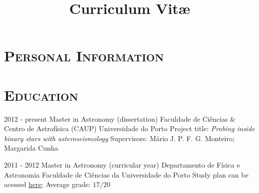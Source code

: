 \documentclass[10pt]{moderncv}
\title{Curriculum Vit\ae{}}
\begin{document}
\maketitle

\section{\textsc{Personal Information}}





\section{\textsc{Education}}

\cventry
	{2012 - present}
	{Master in Astronomy (dissertation)}
	{\newline Faculdade de Ciências \& Centro de Astrofísica (CAUP)}
	{Universidade do Porto}
	{\newline Project title: \emph{Probing inside binary stars with asteroseismology}
	\newline
	Supervisors: Mário J. P. F. G. Monteiro; Margarida Cunha}
	{}  %


\cventry
	{2011 - 2012}
	{Master in Astronomy (curricular year)}
	{\newline Departamento de Física e Astronomia}
	{Faculdade de Ciências da Universidade do Porto}
	{Study plan can be acessed \href{https://sigarra.up.pt/fcup/pt/cur_geral.cur_planos_estudos_view?pv_plano_id=3421&pv_ano_lectivo=2012&pv_tipo_cur_sigla=&pv_origem=CUR}{here}; \newline 
	Average grade: $17$/$20$}
	{}  %
\end{document}
